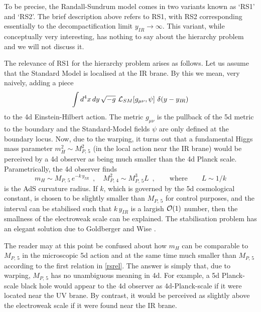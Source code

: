\documentclass[12pt]{article}
\newcommand{\be}{\begin{equation}}
\newcommand{\ee}{\end{equation}}
\numberwithin{equation}{section}
\begin{document}
To be precise, the Randall-Sundrum model comes in two variants known as `RS1'\cite{Randall:1999ee} and `RS2'\cite{Randall:1999vf}. The brief description above refers to RS1, with RS2 corresponding essentially to the decompactification limit $y_{I\!R}\to\infty$. This variant, while conceptually very interesting, has nothing to say about the hierarchy problem and we will not discuss it.

The relevance of RS1 for the hierarchy problem arises as follows. Let us assume that the Standard Model is localised at the IR brane. By this we mean, very naively, adding a piece
\be
\int d^4 x\, dy\, \sqrt{-g}\,\,{\cal L}_{SM}[g_{\mu\nu},\psi]\,\,\delta(y-y_{I\!R})
\ee
to the 4d Einstein-Hilbert action. The metric $g_{\mu\nu}$ is the pullback of the 5d metric to the boundary and the Standard-Model fields $\psi$ are only defined at the boundary locus. Now, due to the warping, it turns out that a fundamental Higgs mass parameter $m_H^2\sim M_{P,\,5}^2$ (in the local action near the IR brane) would be perceived by a 4d observer as being much smaller than the 4d Planck scale. Parametrically, the 4d observer finds
\be
m_H\sim M_{P,\,5}\,e^{-k\,y_{I\!R}}\,\,\,,\quad
M_{P,\,4}^2\sim M_{P,\,5}^3L\,\,\,,\qquad\mbox{where}\qquad L\sim1/k\label{rsrel}
\ee
is the AdS curvature radius. If $k$, which is governed by the 5d cosmological constant, is chosen to be slightly smaller than $M_{P,\,5}$ for control purposes, and the interval can be stabilised such that $k\,y_{I\!R}$ is a largish ${\cal O}(1)$ number, then the smallness of the electroweak scale can be explained. The stabilisation problem has an elegant solution due to Goldberger and Wise \cite{Goldberger:1999uk}.

The reader may at this point be confused about how $m_H$ can be comparable to $M_{P,\,5}$ in the microscopic 5d action and at the same time much smaller than $M_{P,\,5}$ according to the first relation in \eqref{rsrel}. The answer is simply that, due to warping, $M_{P,\,5}$ has no unambiguous meaning in 4d. For example, a 5d Planck-scale black hole would appear to the 4d observer as 4d-Planck-scale if it were located near the UV brane. By contrast, it would be perceived as slightly above the electroweak scale if it were found near the IR brane.
\end{document}
